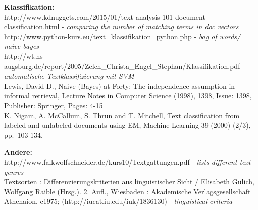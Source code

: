 \documentclass[]{article}
\begin{document}
\textbf{Klassifikation:}\\
http://www.kdnuggets.com/2015/01/text-analysis-101-document-classification.html
- \emph{comparing the number of matching terms in doc vectors}\\
http://www.python-kurs.eu/text\_klassifikation\_python.php - \emph{bag
of words/ naive bayes}\\
http://wt.hs-augsburg.de/report/2005/Zelch\_Christa\_Engel\_Stephan/Klassifikation.pdf
- \emph{automatische Textklassifizierung mit SVM}\\
Lewis, David D., Naive (Bayes) at Forty: The independence assumption in
informal retrieval, Lecture Notes in Computer Science (1998), 1398,
Issue: 1398, Publisher: Springer, Pages: 4-15\\
K. Nigam, A. McCallum, S. Thrun and T. Mitchell, Text classification
from labeled and unlabeled documents using EM, Machine Learning 39
(2000) (2/3), pp.~103-134.

\textbf{Andere:}\\
http://www.falkwolfschneider.de/kurs10/Textgattungen.pdf - \emph{lists
different text genres}\\
Textsorten : Differenzierungskriterien aus linguistischer Sicht /
Elisabeth Gülich, Wolfgang Raible (Hrsg.). 2. Aufl., Wiesbaden :
Akademische Verlagsgesellschaft Athenaion, c1975;
(http://iucat.iu.edu/iuk/1836130) - \emph{linguistical criteria}
\end{document}
